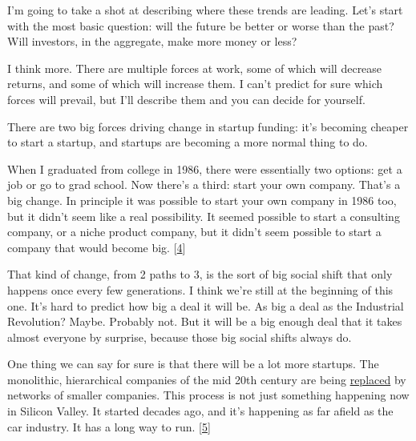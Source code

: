 I'm going
                  to take a shot at describing where these trends are leading.
                  Let's start with the most basic question: will the future be
                  better or worse than the past? Will investors, in the
                  aggregate, make more money or less?

I think more.
                  There are multiple forces at work, some of which will decrease
                  returns, and some of which will increase them. I can't predict
                  for sure which forces will prevail, but I'll describe them and
                  you can decide for yourself.

There are two big
                  forces driving change in startup funding: it's becoming
                  cheaper to start a startup, and startups are becoming a more
                  normal thing to do.

When I graduated from college
                  in 1986, there were essentially two options: get a job or go
                  to grad school. Now there's a third: start your own company.
                  That's a big change. In principle it was possible to start
                  your own company in 1986 too, but it didn't seem like a real
                  possibility. It seemed possible to start a consulting company,
                  or a niche product company, but it didn't seem possible to
                  start a company that would become big.
                  [\href{\#f4n}{4}]

That kind of change, from 2 paths to 3, is the
                  sort of big social shift that only happens once every few
                  generations. I think we're still at the beginning of this one.
                  It's hard to predict how big a deal it will be. As big a deal
                  as the Industrial Revolution? Maybe. Probably not. But it will
                  be a big enough deal that it takes almost everyone by
                  surprise, because those big social shifts always do.

One
                  thing we can say for sure is that there will be a lot more
                  startups. The monolithic, hierarchical companies of the mid
                  20th century are being \href{http://www.paulgraham.com/highres.html}{replaced} by
                  networks of smaller companies. This process is not just
                  something happening now in Silicon Valley. It started decades
                  ago, and it's happening as far afield as the car industry. It
                  has a long way to run.
                  [\href{\#f5n}{5}]


